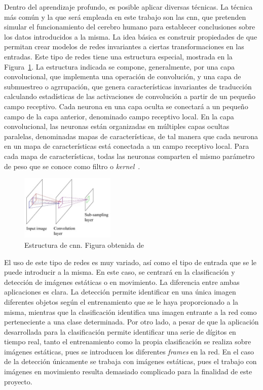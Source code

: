 Dentro del aprendizaje profundo, es posible aplicar diversas técnicas. La técnica más común y la que será empleada en este trabajo son las \acrfull{cnn}, que pretenden simular el funcionamiento del cerebro humano para establecer conclusiones sobre los datos introducidos a la misma. La idea básica es construir propiedades de que permitan crear modelos de redes invariantes a ciertas transformaciones en las entradas. Este tipo de redes tiene una estructura especial, mostrada en la Figura~\ref{fig.cnn}. La estructura indicada se compone, generalmente, por una capa convolucional, que implementa una operación de convolución, y una capa de submuestreo o agrrupación, que genera características invariantes de traducción calculando estadísticas de las activaciones de convolución a partir de un pequeño campo receptivo. Cada neurona en una capa oculta se conectará a un pequeño campo de la capa anterior, denominado campo receptivo local. En la capa convolucional, las neuronas están organizadas en múltiples capas ocultas paralelas, denominadas mapas de características, de tal manera que cada neurona en un mapa de características está conectada a un campo receptivo local. Para cada mapa de características, todas las neuronas comparten el mismo parámetro de peso que se conoce como filtro o \textit{kernel}~\cite{cnn}.

\begin{figure}[H]
	\begin{center}
		\includegraphics[width=0.4\textwidth]{figures/cnn}
		\caption{Estructura de \acrshort{cnn}. Figura obtenida de~\cite{cnn}}
		\label{fig.cnn}
	\end{center}
\end{figure}

El uso de este tipo de redes es muy variado, así como el tipo de entrada que se le puede introducir a la misma. En este caso, se centrará en la clasificación y detección de imágenes estáticas o en movimiento. La diferencia entre ambas aplicaciones es clara. La detección permite identificar en una única imagen diferentes objetos según el entrenamiento que se le haya proporcionado a la misma, mientras que la clasificación identifica una imagen entrante a la red como perteneciente a una clase determinada. Por otro lado, a pesar de que la aplicación desarrollada para la clasificación permite identificar una serie de dígitos en tiempo real, tanto el entrenamiento como la propia clasificación se realiza sobre imágenes estáticas, pues se introducen los diferentes \textit{frames} en la red. En el caso de la detección únicamente se trabaja con imágenes estáticas, pues el trabajo con imágenes en movimiento resulta demasiado complicado para la finalidad de este proyecto.\\

